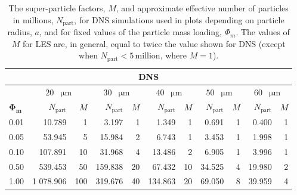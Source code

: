 \documentclass{pracamgren}
\begin{document}
\begin{table}[h]
\centering
\scriptsize
\begin{tabular}{l|rr|rr|rr|rr|rr}
\multicolumn{11}{c}{\textbf{DNS}} \\ \hline
& \multicolumn{2}{c|}{$20$~$\upmu\text{m}$} & \multicolumn{2}{c|}{$30$~$\upmu\text{m}$} & \multicolumn{2}{c|}{$40$~$\upmu\text{m}$} & \multicolumn{2}{c|}{$50$~$\upmu\text{m}$} & \multicolumn{2}{c}{$60$~$\upmu\text{m}$} \\
$\mathbf{\Phi_m}$ & $N_{\text{part}}$ & $M$ & $N_{\text{part}}$ & $M$ & $N_{\text{part}}$ & $M$ & $N_{\text{part}}$ & $M$ & $N_{\text{part}}$ & $M$ \\ \hline
0.01 & 10.789 & 1 & 3.197 & 1 & 1.349 & 1 & 0.691 & 1 & 0.400 & 1 \\ 
0.05 & 53.945 & 5 & 15.984 & 2 & 6.743 & 1 & 3.453 & 1 & 1.998 & 1 \\ 
0.10 & 107.891 & 10 & 31.968 & 4 & 13.486 & 2 & 6.905 & 1 & 3.996 & 1 \\ 
0.50 & 539.453 & 50 & 159.838 & 20 & 67.432 & 10 & 34.525 & 4 & 19.980 & 2 \\  
1.00 & 1 078.906 & 100 & 319.676 & 40 & 134.863 & 20 & 69.050 & 8 & 39.959 & 4 \\ \hline 
\end{tabular}
\caption{The super-particle factors, $M$, and approximate effective number of particles in millions, $N_{\text{part}}$, for DNS simulations used in plots depending on particle radius, $a$, and for fixed values of the particle mass loading, $\Phi_m$.
The values of $M$ for LES are, in general, equal to twice the value shown for DNS (except when $N_{\text{part}} < 5 \, \text{million}$, where $M=1$).
}
\label{tab:spp-phic}
\end{table}
\end{document}

